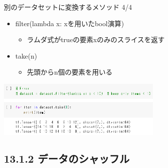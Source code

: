 \documentclass[aspectratio=169, dvipdfmx, 14pt, xcolor={svgnames,dvipsnames}, t]{beamer}
\begin{document}
\begin{frame}{別のデータセットに変換するメソッド 4/4}\label{ux5225ux306eux30c7ux30fcux30bfux30bbux30c3ux30c8ux306bux5909ux63dbux3059ux308bux30e1ux30bdux30c3ux30c9-44}

  \begin{itemize}
    \tightlist
    \item
          filter(lambda x: xを用いたbool演算)

          \begin{itemize}
            \tightlist
            \item
                  \alert{ラムダ式がtrueの要素xのみのスライスを返す}
          \end{itemize}
    \item
          take(n)

          \begin{itemize}
            \tightlist
            \item
                  \alert{先頭からn個の要素を用いる}
          \end{itemize}
  \end{itemize}

  \centering
  \includegraphics[width=230pt]{img/hands-on-ml_13-1-1_5.png}

\end{frame}


\hypertarget{ux30c7ux30fcux30bfux306eux30b7ux30e3ux30c3ux30d5ux30eb}{%
  \subsection{13.1.2 データのシャッフル}\label{ux30c7ux30fcux30bfux306eux30b7ux30e3ux30c3ux30d5ux30eb}}

\end{document}

